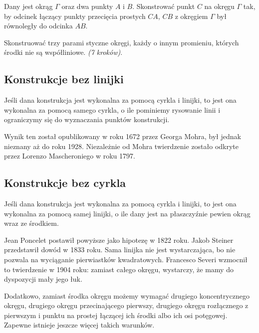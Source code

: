 \begin{problem}
    Dany jest okrąg $\Gamma$ oraz dwa punkty $A$ i $B$.
    Skonstrować punkt $C$ na okręgu $\Gamma$ tak, by odcinek łączący punkty przecięcia prostych $CA$, $CB$ z okręgiem $\Gamma$ był równoległy do odcinka $AB$.
\end{problem}

\begin{problem}
    Skonstruować trzy parami styczne okręgi, każdy o innym promieniu, których środki nie są współliniowe. \hfill \emph{(7 kroków)}. %
\end{problem}

\subsection{Konstrukcje bez linijki}
\begin{theorem}
    Jeśli dana konstrukcja jest wykonalna za pomocą cyrkla i linijki, to jest ona wykonalna za pomocą samego cyrkla, o ile pominiemy rysowanie linii i ograniczymy się do wyznaczania punktów konstrukcji.
\end{theorem}

Wynik ten został opublikowany w roku 1672 przez Georga Mohra, był jednak nieznany aż do roku 1928. Niezależnie od Mohra twierdzenie zostało odkryte przez Lorenzo Mascheroniego w roku 1797.


\subsection{Konstrukcje bez cyrkla}
\begin{theorem}
    Jeśli dana konstrukcja jest wykonalna za pomocą cyrkla i linijki, to jest ona wykonalna za pomocą samej linijki, o ile dany jest na płaszczyźnie pewien okrąg wraz ze środkiem.
\end{theorem}

Jean Poncelet postawił powyższe jako hipotezę w 1822 roku.
%
Jakob Steiner przedstawił dowód w 1833 roku.
Sama linijka nie jest wystarczająca, bo nie pozwala na wyciąganie pierwiastków kwadratowych.
Francesco Severi wzmocnił to twierdzenie w 1904 roku: zamiast całego okręgu, wystarczy, że mamy do dyspozycji mały jego łuk.

Dodatkowo, zamiast środka okręgu możemy wymagać drugiego koncentrycznego okręgu, drugiego okręgu przecinającego pierwszy, drugiego okręgu rozłącznego z pierwszym i punktu na prostej łączącej ich środki albo ich osi potęgowej.
Zapewne istnieje jeszcze więcej takich warunków.








